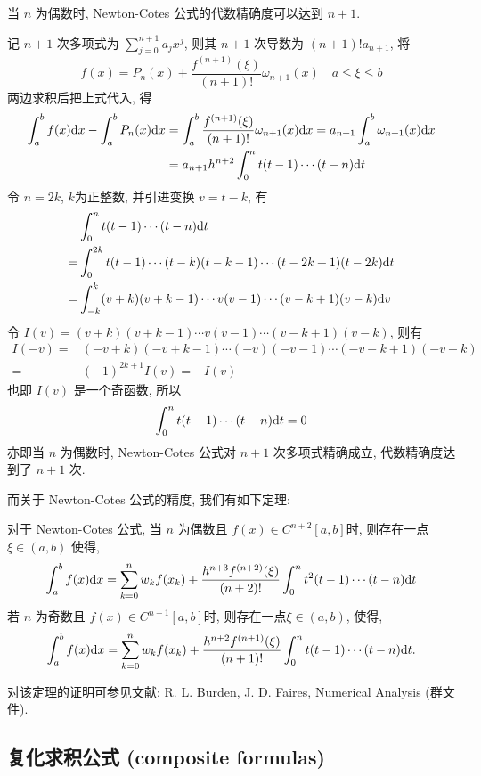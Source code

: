 \documentclass[a4paper]{ctexart}
\newcommand{\hl}[1]
{\noindent {\bf {#1}}}
\begin{document}
{\hl{定理} 当 $n$ 为偶数时, Newton-Cotes 公式的代数精确度可以达到 $n + 1$.

\hl{证明}
记 $n + 1$ 次多项式为 $\sum^{n+1}_{j=0}a_jx^j$, 
则其 $n+1$ 次导数为 $(n+1)!a_{n+1}$, 将
\begin{equation}
  f(x) = P_n(x)+\frac{f^{(n+1)}(\xi)}{(n+1)!}\omega_{n+1}(x)\quad
  a\leq\xi\leq b 
  \end{equation}
两边求积后把上式代入, 得
\begin{align}
  \int^b_af(x){\rm d}x-\int^b_aP_n(x){\rm d}x&
  =\int^b_a\frac{f^{(n+1)}(\xi)}{(n+1)!}\omega_{n+1}(x){\rm d}x=a_{n+1}\int^b_a\omega_{n+1}(x){\rm d}x\\
  &=a_{n+1}h^{n+2}\int^n_0t(t-1)\cdots(t-n){\rm d}t    
\end{align}
令 $n=2k$, $k$为正整数, 并引进变换 $v=t-k$, 有
\begin{align}
  &\int^n_0t(t-1)\cdots(t-n){\rm d}t\\
  =&\int^{2k}_0t(t-1)\cdots(t-k)(t-k-1)\cdots(t-2k+1)(t-2k){\rm d}t\\
  =&\int^k_{-k}(v+k)(v+k-1)\cdots v(v-1)\cdots(v-k+1)(v-k){\rm d}v    
\end{align}
令 $I(v)=(v+k)(v+k-1)\cdots v(v-1)\cdots(v-k+1)(v-k)$, 则有
\begin{align}
  I(-v)=&(-v+k)(-v+k-1)\cdots (-v)(-v-1)\cdots(-v-k+1)(-v-k)\\
  =&(-1)^{2k+1}I(v)=-I(v)    
\end{align}
也即 $I(v)$ 是一个奇函数, 所以
$$
\int^n_0t(t-1)\cdots(t-n){\rm d}t=0
$$
亦即当 $n$ 为偶数时, Newton-Cotes 公式对 $n + 1$ 次多项式精确成立, 代数精确度达到了 $n + 1$ 次.

而关于 Newton-Cotes 公式的精度, 我们有如下定理:

\hl{定理}   
对于 Newton-Cotes 公式, 当 $n$ 为偶数且 
$f(x)\in C^{n+2}[a,b]$时, 则存在一点 $\xi\in(a,b)$ 使得, 
$$
\int^b_af(x){\rm d}x =\sum^n_{k=0}w_kf(x_k)+ \frac{h^{n+3}f^{(n+2)}(\xi)}{(n+2)!}
\int^n_0t^2(t-1)\cdots(t-n){\rm d}t
$$
若 $n$ 为奇数且 $f(x)\in C^{n+1}[a,b]$时, 则存在一点$\xi\in(a,b)$, 使得, 
$$
\int^b_af(x){\rm d}x =\sum^n_{k=0}w_kf(x_k)+ 
\frac{h^{n+2}f^{(n+1)}(\xi)}{(n+1)!}\int^n_0t(t-1)\cdots(t-n){\rm d}t.
$$

对该定理的证明可参见文献: R. L. Burden, J. D. Faires, Numerical Analysis (群文件).


\subsection{复化求积公式 (composite formulas)}

}
\end{document}
